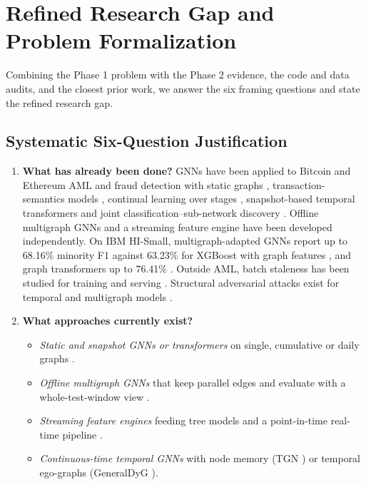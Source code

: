 \documentclass[11pt,a4paper]{article}
\begin{document}
\section{Refined Research Gap and Problem Formalization}
\label{sec:refined_gap}

Combining the Phase 1 problem with the Phase 2 evidence, the code and data audits, and the closest prior work, we answer the six framing questions and state the refined research gap.

\subsection{Systematic Six-Question Justification}
\begin{enumerate}[leftmargin=*]
    \item \textbf{What has already been done?}
    GNNs have been applied to Bitcoin and Ethereum AML and fraud detection with static graphs \cite{ferretti2025aml,li2025tfgat,kasula2025ajk,alemari2026explainable}, transaction-semantics models \cite{jia2025lmae4eth}, continual learning over stages \cite{tian2025kar}, snapshot-based temporal transformers \cite{lin2026chronowave} and joint classification--sub-network discovery \cite{rico2026taml}. Offline multigraph GNNs \cite{egressy2024multigraph,ding2024diam,bilgi2026mega} and a streaming feature engine \cite{blanusa2024gfp} have been developed independently. On IBM HI-Small, multigraph-adapted GNNs report up to 68.16\% minority F1 against 63.23\% for XGBoost with graph features \cite{egressy2024multigraph}, and graph transformers up to 76.41\% \cite{lin2024fraudgt}. Outside AML, batch staleness has been studied for training and serving \cite{su2024pres,zhou2025badgnn,anchorrm2026,streamtgn2026}. Structural adversarial attacks exist for temporal and multigraph models \cite{dai2025memfreezing,jeon2025hia,heijmans2026robust}.

    \item \textbf{What approaches currently exist?}
    \begin{itemize}[leftmargin=*]
        \item \textit{Static and snapshot GNNs or transformers} on single, cumulative or daily graphs \cite{ferretti2025aml,li2025tfgat,kasula2025ajk,lin2026chronowave,rico2026taml}.
        \item \textit{Offline multigraph GNNs} that keep parallel edges and evaluate with a whole-test-window view \cite{egressy2024multigraph,bilgi2026mega,lin2024fraudgt}.
        \item \textit{Streaming feature engines} feeding tree models \cite{blanusa2024gfp} and a point-in-time real-time pipeline \cite{abolfadl2026kontograph}.
        \item \textit{Continuous-time temporal GNNs} with node memory (TGN \cite{rossi2020tgn}) or temporal ego-graphs (GeneralDyG \cite{yang2025generaldyg}).
    \end{itemize}


\end{enumerate}
\end{document}

